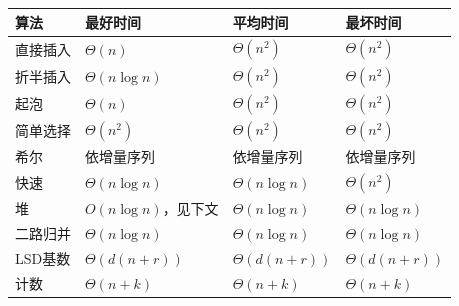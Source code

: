 \begin{wideblock}

\par\medskip\noindent\begin{minipage}{\linewidth}\fontsize{9.3}{12}\selectfont\begin{tabularx}{\linewidth}{@{}YYYY@{}}
\toprule\noalign{}
算法 & 最好时间 & 平均时间 & 最坏时间 \\
\midrule\noalign{}


直接插入 & \(\Theta(n)\) & \(\Theta(n^2)\) & \(\Theta(n^2)\) \\
折半插入 & \(\Theta(n\log n)\) & \(\Theta(n^2)\) & \(\Theta(n^2)\) \\
起泡 & \(\Theta(n)\) & \(\Theta(n^2)\) & \(\Theta(n^2)\) \\
简单选择 & \(\Theta(n^2)\) & \(\Theta(n^2)\) & \(\Theta(n^2)\) \\
希尔 & 依增量序列 & 依增量序列 & 依增量序列 \\
快速 & \(\Theta(n\log n)\) & \(\Theta(n\log n)\) & \(\Theta(n^2)\) \\
堆 & \(O(n\log n)\)，见下文 & \(\Theta(n\log n)\) & \(\Theta(n\log n)\) \\
二路归并 & \(\Theta(n\log n)\) & \(\Theta(n\log n)\) & \(\Theta(n\log n)\) \\
LSD基数 & \(\Theta(d(n+r))\) & \(\Theta(d(n+r))\) & \(\Theta(d(n+r))\) \\
计数 & \(\Theta(n+k)\) & \(\Theta(n+k)\) & \(\Theta(n+k)\) \\
\bottomrule\end{tabularx}
\end{minipage}\par\medskip

\end{wideblock}

